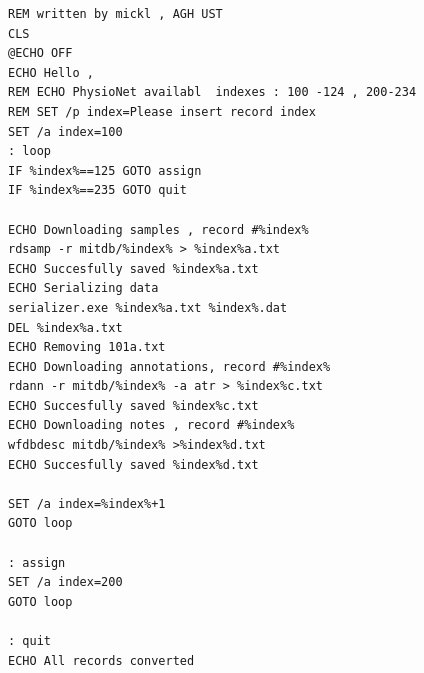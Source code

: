 \begin{minipage}{\textwidth}
\begin{verbatim}
REM written by mickl , AGH UST
CLS
@ECHO OFF
ECHO Hello ,
REM ECHO PhysioNet availabl  indexes : 100 -124 , 200-234
REM SET /p index=Please insert record index
SET /a index=100
: loop
IF %index%==125 GOTO assign
IF %index%==235 GOTO quit

ECHO Downloading samples , record #%index%
rdsamp -r mitdb/%index% > %index%a.txt
ECHO Succesfully saved %index%a.txt
ECHO Serializing data
serializer.exe %index%a.txt %index%.dat
DEL %index%a.txt
ECHO Removing 101a.txt
ECHO Downloading annotations, record #%index%
rdann -r mitdb/%index% -a atr > %index%c.txt
ECHO Succesfully saved %index%c.txt
ECHO Downloading notes , record #%index%
wfdbdesc mitdb/%index% >%index%d.txt
ECHO Succesfully saved %index%d.txt

SET /a index=%index%+1
GOTO loop

: assign
SET /a index=200
GOTO loop

: quit
ECHO All records converted
\end{verbatim}
\end{minipage}